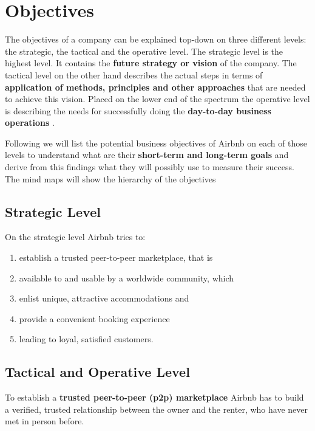 \section{Objectives} %
\label{sec:objectives}
The objectives of a company can be explained top-down on three different levels: the strategic, the tactical and the operative level. The strategic level is the highest level. It contains the {\bf future strategy or vision} of the company. The tactical level on the other hand describes the actual steps in terms of {\bf application of methods, principles and other approaches} that are needed to achieve this vision. Placed on the lower end of the spectrum the operative level is describing the needs for successfully doing the {\bf day-to-day business operations} \citep{Boundless14}.
\vspace{0.2cm}

Following we will list the potential business objectives of Airbnb on each of those levels to understand what are their {\bf short-term and long-term goals} and derive from this findings what they will possibly use to measure their success. The mind maps will show the hierarchy of the objectives

\subsection{Strategic Level} %
\label{sub:strategic_lvl}
On the strategic level Airbnb tries to:
	\begin{enumerate}
    	\item establish a trusted peer-to-peer marketplace, that is
        \item available to and usable by a worldwide community, which
        \item enlist unique, attractive accommodations and
        \item provide a convenient booking experience
        \item leading to loyal, satisfied customers.
    \end{enumerate}


\subsection{Tactical and Operative Level} %
\label{sub:tactical_operative_lvl}
To establish a {\bf trusted peer-to-peer (p2p) marketplace} Airbnb has to build a verified, trusted relationship between the owner and the renter, who have never met in person before.
\vspace{0.2cm}

